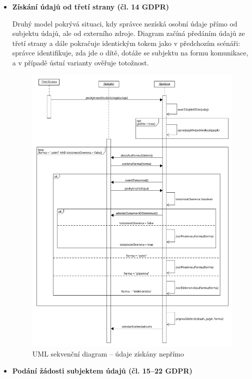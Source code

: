 \begin{itemize}
  \item \textbf{Získání údajů od třetí strany (čl. 14 GDPR)}

  Druhý model pokrývá situaci, kdy správce nezíská osobní údaje přímo od subjektu údajů, ale od externího zdroje. Diagram začíná předáním údajů ze třetí strany a dále pokračuje identickým tokem jako v předchozím scénáři: správce identifikuje, zda jde o dítě, dotáže se subjektu na formu komunikace, a v případě ústní varianty ověřuje totožnost.

  \begin{figure}[H]
    \centering
    \includegraphics[width=\textwidth]{images/UML_sekvence_informace_neprimo.png}
    \caption{UML sekvenční diagram – údaje získány nepřímo}
    \label{fig:uml_sekvence_informace_neprimo}
  \end{figure}

  \item \textbf{Podání žádosti subjektem údajů (čl. 15–22 GDPR)}


\end{itemize}
